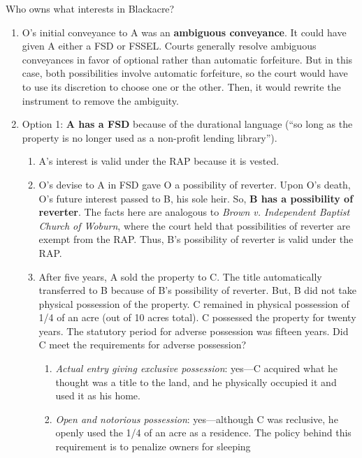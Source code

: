 Who owns what interests in Blackacre?

\begin{enumerate}
    \item O's initial conveyance to A was an \textbf{ambiguous conveyance}. It 
    could have given A either a FSD or FSSEL. Courts generally resolve 
    ambiguous conveyances in favor of optional rather than automatic 
    forfeiture. But in this case, both possibilities involve automatic 
    forfeiture, so the court would have to use its discretion to choose one or 
    the other. Then, it would rewrite the instrument to remove the ambiguity.
    \item Option 1: \textbf{A has a FSD} because of the durational language 
    (``so long as the property is no longer used as a non-profit lending 
    library'').
    \begin{enumerate}
        \item A's interest is valid under the RAP because it is vested.
        \item O's devise to A in FSD gave O a possibility of reverter. Upon 
        O's death, O's future interest passed to B, his sole heir. So, 
        \textbf{B has a possibility of reverter}. The facts here are analogous 
        to \emph{Brown v. Independent Baptist Church of Woburn}, where the 
        court held that possibilities of reverter are exempt from the RAP. 
        Thus, B's possibility of reverter is valid under the RAP.
        \item After five years, A sold the property to C. The title 
        automatically transferred to B because of B's possibility of reverter. 
        But, B did not take physical possession of the property. C remained in 
        physical possession of 1/4 of an acre (out of 10 acres total). C 
        possessed the property for twenty years. The statutory period for 
        adverse possession was fifteen years. Did C meet the requirements for 
        adverse possession?
        \begin{enumerate}
            \item \emph{Actual entry giving exclusive possession}: yes---C 
            acquired what he thought was a title to the land, and he 
            physically occupied it and used it as his home.
            \item \emph{Open and notorious possession}: yes---although C was 
            reclusive, he openly used the 1/4 of an acre as a residence. The 
            policy behind this requirement is to penalize owners for sleeping 

\end{enumerate}
\end{enumerate}
\end{enumerate}

